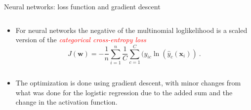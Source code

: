 \documentclass[10pt,ignorenonframetext,]{beamer}
\providecommand{\tightlist}{%
  \setlength{\itemsep}{0pt}\setlength{\parskip}{0pt}}
\begin{document}
\begin{frame}

\begin{block}{Neural networks: loss function and gradient descent}

\(~\)

\begin{itemize}
\tightlist
\item
  For neural networks the negative of the multinomial loglikelihood is a
  scaled version of the
  \emph{\textcolor{red}{categorical cross-entropy loss}}
  \[ J({\boldsymbol w})=-\frac{1}{n}\sum_{i=1}^n\frac{1}{C} \sum_{c=1}^C (y_{ic}\ln({\hat{y}_c({\boldsymbol x}_i)}) \ .\]
\end{itemize}

\(~\)

\begin{itemize}
\tightlist
\item
  The optimization is done using gradient descent, with minor changes
  from what was done for the logistic regression due to the added sum
  and the change in the activation function.
\end{itemize}

\end{block}

\end{frame}
\end{document}
